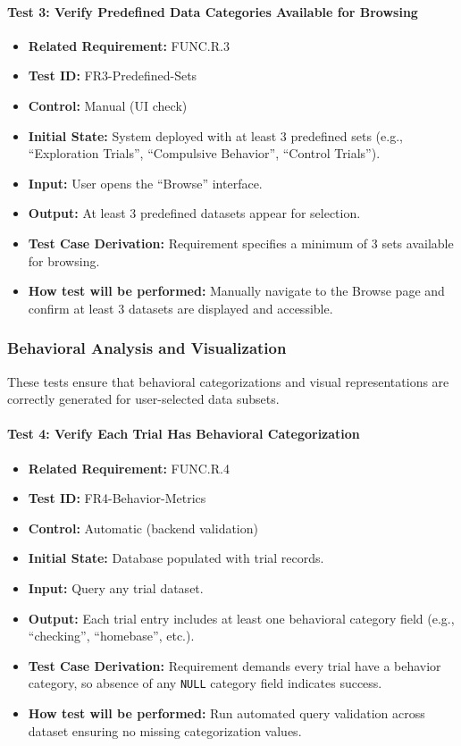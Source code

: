 \documentclass[12pt, titlepage]{article}
\begin{document}
\paragraph{Test 3: Verify Predefined Data Categories Available for Browsing}
\begin{itemize}
    \item \textbf{Related Requirement:} FUNC.R.3
    \item \textbf{Test ID:} FR3-Predefined-Sets
    \item \textbf{Control:} Manual (UI check)
    \item \textbf{Initial State:} System deployed with at least 3 predefined sets (e.g., ``Exploration Trials'', ``Compulsive Behavior'', ``Control Trials'').
    \item \textbf{Input:} User opens the ``Browse'' interface.
    \item \textbf{Output:} At least 3 predefined datasets appear for selection.
    \item \textbf{Test Case Derivation:} Requirement specifies a minimum of 3 sets available for browsing.
    \item \textbf{How test will be performed:} Manually navigate to the Browse page and confirm at least 3 datasets are displayed and accessible.
\end{itemize}

\subsubsection{Behavioral Analysis and Visualization}

These tests ensure that behavioral categorizations and visual representations are correctly generated for user-selected data subsets.

\paragraph{Test 4: Verify Each Trial Has Behavioral Categorization}
\begin{itemize}
    \item \textbf{Related Requirement:} FUNC.R.4
    \item \textbf{Test ID:} FR4-Behavior-Metrics
    \item \textbf{Control:} Automatic (backend validation)
    \item \textbf{Initial State:} Database populated with trial records.
    \item \textbf{Input:} Query any trial dataset.
    \item \textbf{Output:} Each trial entry includes at least one behavioral category field (e.g., ``checking'', ``homebase'', etc.).
    \item \textbf{Test Case Derivation:} Requirement demands every trial have a behavior category, so absence of any \texttt{NULL} category field indicates success.
    \item \textbf{How test will be performed:} Run automated query validation across dataset ensuring no missing categorization values.
\end{itemize}
\end{document}
